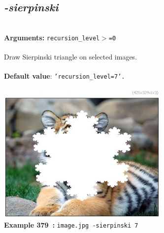 \documentclass[a4paper,11pt,twoside]{book}
\begin{document}
\subsection{\emph{-sierpinski} }\vspace*{-0.5em}
~\\\textbf{Arguments: } 
{\small \texttt{recursion\_level$>$=0}}\\~\\
Draw Sierpinski triangle on selected images.
~\\~\\\textbf{Default value}: {\small \texttt{'recursion\_level=7'.}}
\begin{center}\includegraphics[keepaspectratio=true,height=7cm,width=\textwidth]{img/gmic_def379.jpg}\\
{\footnotesize \textbf{Example 379~:} \texttt{image.jpg -sierpinski 7}}
\end{center}
\end{document}
